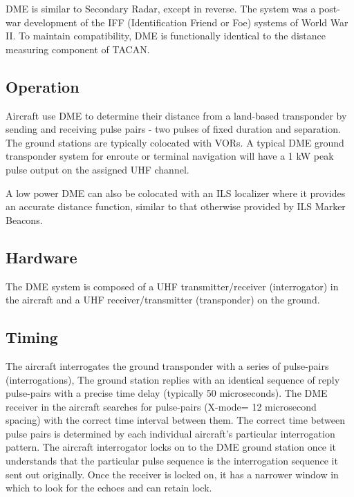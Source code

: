 DME is similar to Secondary Radar, except in reverse. The system was a post-war development of the IFF (Identification Friend or Foe) systems of World War II. To maintain compatibility, DME is functionally identical to the distance measuring component of TACAN.

\subsection*{Operation}
\label{Operation}


Aircraft use DME to determine their distance from a land-based transponder by sending and receiving pulse pairs - two pulses of fixed duration and separation. The ground stations are typically colocated with VORs. A typical DME ground transponder system for enroute or terminal navigation will have a 1 kW peak pulse output on the assigned UHF channel.

A low power DME can also be colocated with an ILS localizer where it provides an accurate distance function, similar to that otherwise provided by ILS Marker Beacons.

\subsection*{Hardware}
\label{Hardware}


The DME system is composed of a UHF transmitter/receiver (interrogator) in the aircraft and a UHF receiver/transmitter (transponder) on the ground.

\subsection*{Timing}
\label{Timing}


The aircraft interrogates the ground transponder with a series of pulse-pairs (interrogations), The ground station replies with an identical sequence of reply pulse-pairs with a precise time delay (typically 50 microseconds). The DME receiver in the aircraft searches for pulse-pairs (X-mode= 12 microsecond spacing) with the correct time interval between them. The correct time between pulse pairs is determined by each individual aircraft's particular interrogation pattern. The aircraft interrogator locks on to the DME ground station once it understands that the particular pulse sequence is the interrogation sequence it sent out originally. Once the receiver is locked on, it has a narrower window in which to look for the echoes and can retain lock.

